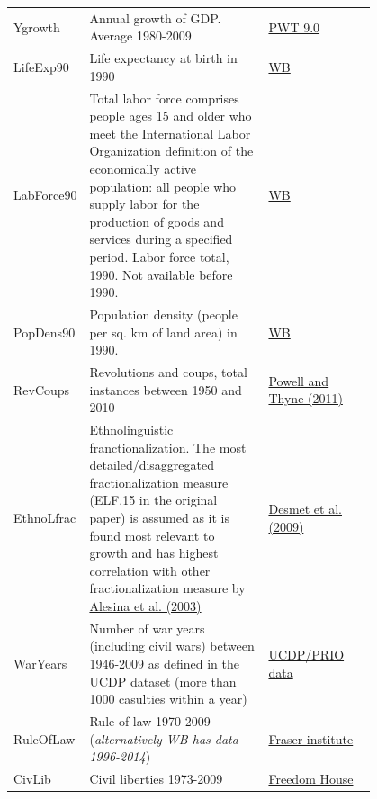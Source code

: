 \begin{refsection}
\begin{subappendices}
\begin{center}
\begin{longtable}{l p{0.50\linewidth} p{0.3\linewidth}}
      Ygrowth & Annual growth of GDP. Average 1980-2009 & \href{http://www.rug.nl/research/ggdc/data/pwt/pwt-9.0}{PWT 9.0} \\
    
      LifeExp90 & Life expectancy at birth in 1990 & \href{http://data.worldbank.org/indicator/SP.DYN.LE00.IN}{WB}\\
         
      LabForce90 & Total labor force comprises people ages 15 and older who meet the International Labor Organization definition of the economically active population: all people who supply labor for the production of goods and services during a specified period. Labor force total, 1990. Not available before 1990. & \href{http://data.worldbank.org/indicator/SL.TLF.CACT.ZS}{WB} \\
    
      PopDens90 & Population density (people per sq. km of land area) in 1990. & \href{http://data.worldbank.org/indicator/EN.POP.DNST}{WB} \\
    
      RevCoups & Revolutions and coups, total instances between 1950 and 2010 & \href{http://jpr.sagepub.com/content/48/2/249.abstract}{Powell and Thyne (2011)} \\
      
      EthnoLfrac & Ethnolinguistic franctionalization. The most detailed/disaggregated fractionalization measure (ELF.15 in the original paper) is assumed as it is found most relevant to growth and has highest correlation with other fractionalization measure by \href{http://www.nsd.uib.no/macrodataguide/set.html?id=16&sub=1}{Alesina et al. (2003)} & \href{http://www.anderson.ucla.edu/faculty_pages/romain.wacziarg/papersum.html}{Desmet et al. (2009)} \\
      
      WarYears & Number of war years (including civil wars) between 1946-2009 as defined in the UCDP dataset (more than 1000 casulties within a year) & \href{http://www.pcr.uu.se/research/ucdp/datasets/ucdp_prio_armed_conflict_dataset/}{UCDP/PRIO data} \\
      
      RuleOfLaw & Rule of law 1970-2009 (\textit{alternatively WB has data 1996-2014})& \href{http://efwdata.com/grid/WxRvYnU#/Grid}{Fraser institute} \\
    
      CivLib & Civil liberties 1973-2009 & \href{https://freedomhouse.org/report/freedom-world-2016/methodology}{Freedom House} \\
      

\end{longtable}
\end{center}
\end{subappendices}
\end{refsection}
